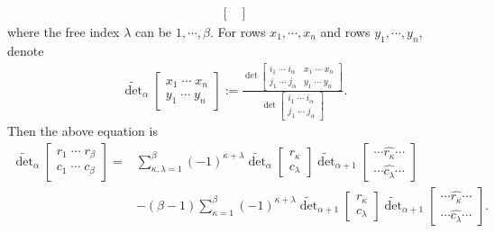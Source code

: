 \documentclass{amsart}
\begin{document}
{{\begin{align}
\begin{bmatrix}
            \end{bmatrix}
        \end{align}
        where the free index $\lambda$ can be $1,\cdots,\beta$. For rows $x_1,\cdots,x_n$ and rows $y_1,\cdots,y_n$, denote 
        \begin{align}
            \widetilde{\det}_\alpha\begin{bmatrix}
                x_1\;\cdots\;x_n\\y_1\;\cdots\;y_n
            \end{bmatrix}:=\frac{\det\begin{bmatrix}
                i_1\;\cdots\;i_\alpha&x_1\;\cdots\;x_n\\
                j_1\;\cdots\;j_\alpha&y_1\;\cdots\;y_n
            \end{bmatrix}}{\det\begin{bmatrix}
                i_1\;\cdots\;i_\alpha\\
                j_1\;\cdots\;j_\alpha
            \end{bmatrix}}. 
        \end{align}
        Then the above equation is 
        \begin{align}
            \widetilde{\det}_\alpha\begin{bmatrix}
                r_1\;\cdots\;r_\beta\\
                c_1\;\cdots\;c_\beta
            \end{bmatrix}={}&\sum_{\kappa,\lambda=1}^\beta(-1)^{\kappa+\lambda}\widetilde{\det}_\alpha\begin{bmatrix}
                r_\kappa\\
                c_\lambda
            \end{bmatrix}\widetilde{\det}_{\alpha+1}\begin{bmatrix}
                \cdots\widehat{r_\kappa}\cdots\\
                \cdots\widehat{c_\lambda}\cdots
            \end{bmatrix}\\
            &-(\beta-1)\sum_{\kappa=1}^\beta(-1)^{\kappa+\lambda}\widetilde{\det}_{\alpha+1}\begin{bmatrix}
                r_\kappa\\
                c_\lambda
            \end{bmatrix}\widetilde{\det}_{\alpha+1}\begin{bmatrix}
                \cdots\widehat{r_\kappa}\cdots\\
                \cdots\widehat{c_\lambda}\cdots
            \end{bmatrix}. 
        \end{align}

}}
\end{document}
